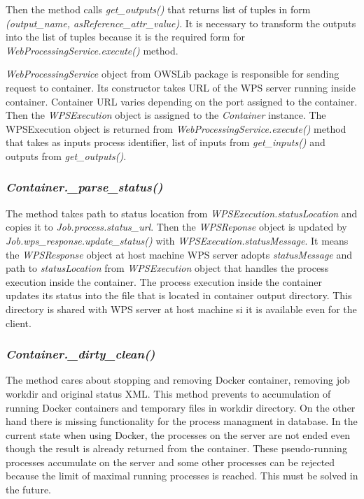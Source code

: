 \documentclass[12pt,a4paper]{article}
\begin{document}
Then the method calls \textit{get\_outputs()} that returns list of tuples in form \textit{(output\_name, asReference\_attr\_value)}. It is 
necessary to transform the outputs into the list of tuples because it is the required form for \textit{WebProcessingService.execute()} method. 

\textit{WebProcessingService} object from OWSLib package is responsible for sending request to container. Its constructor takes URL of the
WPS server running inside container. Container URL varies depending on the port assigned to the container. Then the \textit{WPSExecution}
object is assigned to the \textit{Container} instance. The WPSExecution object is returned from \textit{WebProcessingService.execute()} 
method that takes as inputs process identifier, list of inputs from \textit{get\_inputs()} and outputs from \textit{get\_outputs()}.

\subsubsection{\textit{Container.\_parse\_status()}}
The method takes path to status location from \textit{WPSExecution.statusLocation} and copies it to \textit{Job.process.status\_url}.
Then the \textit{WPSReponse} object is updated by \textit{Job.wps\_response.update\_status()} with \textit{WPSExecution.statusMessage}.
It means the \textit{WPSResponse} object at host machine WPS server adopts \textit{statusMessage} and path to \textit{statusLocation}
from \textit{WPSExecution} object that handles the process execution inside the container. The process execution inside the container
updates its status into the file that is located in container output directory. This directory is shared with WPS server at host machine
si it is available even for the client.

\subsubsection{\textit{Container.\_dirty\_clean()}}
The method cares about stopping and removing Docker container, removing job workdir and original status XML. This method prevents to
accumulation of running Docker containers and temporary files in workdir directory. On the other hand there is missing functionality
for the process managment in database. In the current state when using Docker, the processes on the server are not ended even though
the result is already returned from the container. These pseudo-running processes accumulate on the server and some other processes
can be rejected because the limit of maximal running  processes is reached. This must be solved in the future.
\end{document}
